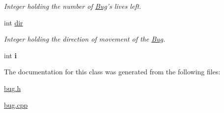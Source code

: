 \begin{DoxyCompactItemize}
\begin{DoxyCompactList}\small\item\em Integer holding the number of \hyperlink{classBug}{Bug}'s lives left. \end{DoxyCompactList}\item 
\hypertarget{classBug_ace580e042da5ec607b1d6b2b06727185}{int \hyperlink{classBug_ace580e042da5ec607b1d6b2b06727185}{dir}}\label{classBug_ace580e042da5ec607b1d6b2b06727185}

\begin{DoxyCompactList}\small\item\em Integer holding the direction of movement of the \hyperlink{classBug}{Bug}. \end{DoxyCompactList}\item 
\hypertarget{classBug_af650f4d487abf1c9a2635a8348a69edc}{int {\bfseries i}}\label{classBug_af650f4d487abf1c9a2635a8348a69edc}

\end{DoxyCompactItemize}


The documentation for this class was generated from the following files\-:\begin{DoxyCompactItemize}
\item 
\hyperlink{bug_8h}{bug.\-h}\item 
\hyperlink{bug_8cpp}{bug.\-cpp}\end{DoxyCompactItemize}
